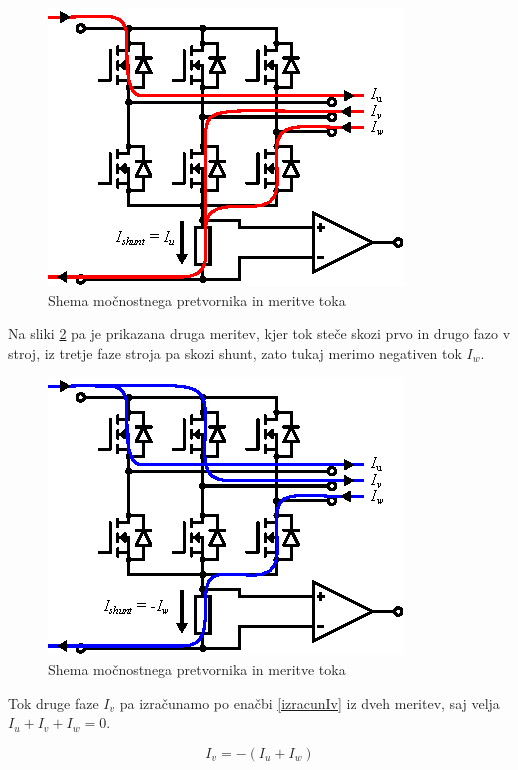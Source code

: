 \documentclass[a4paper,twoside,openright,12pt,slovene]{book}
\begin{document}
\begin{figure}[!htbp]
    \centering
    \includegraphics[width=0.75\columnwidth]{Slike/Inkscape/meritevTokaIu.eps}
    \caption{\label{meritevTokaIu} Shema močnostnega pretvornika in meritve toka }
\end{figure}

Na sliki \ref{meritevTokaIw} pa je prikazana druga meritev, kjer tok steče skozi prvo in drugo fazo v stroj, iz tretje faze stroja pa skozi shunt, zato tukaj merimo negativen tok $I_w$. 

\begin{figure}[!htbp]
    \centering
    \includegraphics[width=0.75\columnwidth]{Slike/Inkscape/meritevTokaIw.eps}
    \caption{\label{meritevTokaIw} Shema močnostnega pretvornika in meritve toka }
\end{figure}

Tok druge faze $I_v$ pa izračunamo po enačbi \ref{izracunIv} iz dveh meritev, saj velja $I_u + I_v + I_w = 0$.


\begin{equation} \label{izracunIv}
I_v = -(I_u + I_w)
\end{equation}
\end{document}
